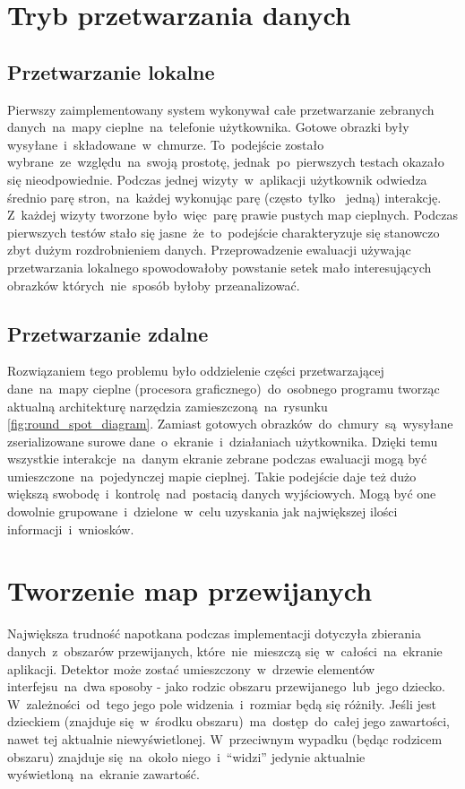\section{Tryb przetwarzania danych}

\subsection{Przetwarzanie lokalne}
Pierwszy zaimplementowany system wykonywał całe przetwarzanie zebranych danych~na~mapy cieplne~na~telefonie użytkownika. Gotowe obrazki były wysyłane~i~składowane~w~chmurze. To~podejście zostało wybrane~ze~względu~na~swoją prostotę, jednak~po~pierwszych testach okazało się nieodpowiednie. Podczas jednej wizyty~w~aplikacji  użytkownik odwiedza średnio parę stron,~na~każdej wykonując parę (często~tylko~ jedną) interakcję. Z~każdej wizyty tworzone było~więc~parę prawie pustych map cieplnych. Podczas pierwszych testów stało się jasne~że~to~podejście charakteryzuje się stanowczo zbyt dużym rozdrobnieniem danych. Przeprowadzenie ewaluacji używając przetwarzania lokalnego spowodowałoby powstanie setek mało interesujących obrazków których~nie~sposób byłoby przeanalizować.

\subsection{Przetwarzanie zdalne}
Rozwiązaniem tego problemu było oddzielenie części przetwarzającej dane~na~mapy cieplne (procesora graficznego)~do~osobnego programu tworząc aktualną architekturę narzędzia zamieszczoną~na~rysunku \ref{fig:round_spot_diagram}. Zamiast gotowych obrazków~do~chmury~są~wysyłane zserializowane surowe dane~o~ekranie~i~działaniach użytkownika. Dzięki temu wszystkie interakcje~na~danym ekranie zebrane podczas ewaluacji mogą być umieszczone~na~pojedynczej mapie cieplnej. Takie podejście daje też dużo większą swobodę~i~kontrolę~nad~postacią danych wyjściowych. Mogą być one dowolnie grupowane~i~dzielone~w~celu uzyskania jak największej ilości informacji~i~wniosków.

\section{Tworzenie map przewijanych}
Największa trudność napotkana podczas implementacji dotyczyła zbierania danych~z~obszarów przewijanych, które~nie~mieszczą się~w~całości~na~ekranie aplikacji. Detektor może zostać umieszczony~w~drzewie elementów interfejsu~na~dwa sposoby - jako rodzic obszaru przewijanego~lub~jego dziecko. W~zależności~od~tego jego pole widzenia~i~rozmiar będą się różniły. Jeśli jest dzieckiem (znajduje się~w~środku obszaru)~ma~dostęp~do~całej jego zawartości, nawet tej aktualnie niewyświetlonej. W~przeciwnym wypadku (będąc rodzicem obszaru) znajduje się~na~około niego~i~``widzi'' jedynie aktualnie wyświetloną~na~ekranie zawartość.


